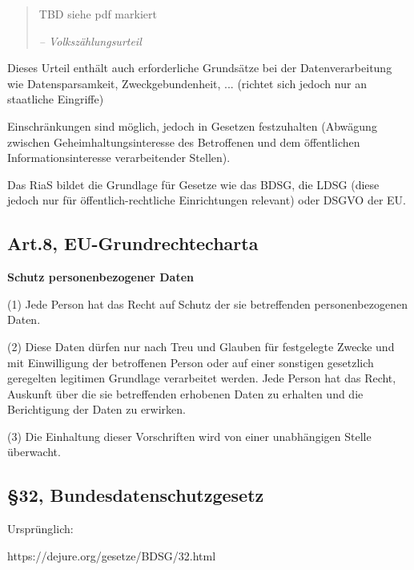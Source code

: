     \begin{quotation}
    TBD siehe pdf markiert
    
    \textit{-- Volkszählungsurteil}
    \end{quotation}
    
    Dieses Urteil enthält auch erforderliche Grundsätze bei der Datenverarbeitung wie Datensparsamkeit, Zweckgebundenheit, ... (richtet sich jedoch nur an staatliche Eingriffe)
    
    Einschränkungen sind möglich, jedoch in Gesetzen festzuhalten (Abwägung zwischen Geheimhaltungsinteresse des Betroffenen und dem öffentlichen Informationsinteresse verarbeitender Stellen).
    
    Das RiaS bildet die Grundlage für Gesetze wie das BDSG, die LDSG (diese jedoch nur für öffentlich-rechtliche Einrichtungen relevant) oder DSGVO der EU.
    
  \subsection*{Art.8, EU-Grundrechtecharta}
      
      \textbf{Schutz personenbezogener Daten}
      
      (1) Jede Person hat das Recht auf Schutz der sie betreffenden personenbezogenen Daten. 
      
      (2) Diese Daten dürfen nur nach Treu und Glauben für festgelegte Zwecke und mit Einwilligung 
      der betroffenen Person oder auf einer sonstigen gesetzlich geregelten legitimen Grundlage verarbeitet werden. Jede Person hat das Recht, Auskunft über die sie betreffenden erhobenen Daten zu erhalten und die Berichtigung der Daten zu erwirken. 
      
      (3) Die Einhaltung dieser Vorschriften wird von einer unabhängigen Stelle überwacht. 
  
  \subsection*{§32, Bundesdatenschutzgesetz}
  
  Ursprünglich:
   
  https://dejure.org/gesetze/BDSG/32.html
  
